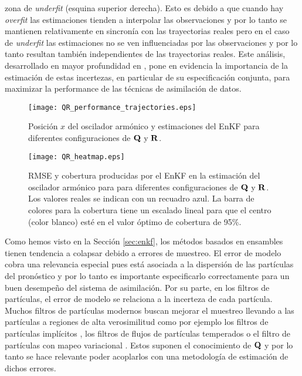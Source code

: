 zona de \textit{underfit} (esquina superior derecha). Esto es debido a que cuando hay \textit{overfit} las estimaciones tienden a interpolar las observaciones y por lo tanto se mantienen relativamente en sincronía con las trayectorias reales pero en el caso de \textit{underfit} las estimaciones no se ven influenciadas por las observaciones y por lo tanto resultan también independientes de las trayectorias reales. Este análisis, desarrollado en mayor profundidad en \cite{Tandeo2020}, pone en evidencia la importancia de la estimación de estas incertezas, en particular de su especificación conjunta, para maximizar la performance de las técnicas de asimilación de datos.

\begin{figure}[h]
    \centering
    \texttt{[image: QR\_performance\_trajectories.eps]}
    \caption{Posición $x$ del oscilador armónico y estimaciones del EnKF para diferentes configuraciones de $\mathbf{Q}$ y $\mathbf{R}$.}
    \label{fig:QR_performance_trajectories}
\end{figure}

\begin{figure}[h]
    \centering
    \texttt{[image: QR\_heatmap.eps]}
    \caption{RMSE y cobertura producidas por el EnKF en la estimación del oscilador armónico para para diferentes configuraciones de $\mathbf{Q}$ y $\mathbf{R}$. Los valores reales se indican con un recuadro azul. La barra de colores para la cobertura tiene un escalado lineal para que el centro (color blanco) esté en el valor óptimo de cobertura de 95\%.}
    \label{fig:QR_heatmap}
\end{figure}

Como hemos visto en la Sección \ref{sec:enkf}, los métodos basados en ensambles tienen tendencia a colapsar debido a errores de muestreo. El error de modelo cobra una relevancia especial pues está asociada a la dispersión de las partículas del pronóstico y por lo tanto es importante especificarlo correctamente para un buen desempeño del sistema de asimilación. Por su parte, en los filtros de partículas, el error de modelo se relaciona a la incerteza de cada partícula. Muchos filtros de partículas modernos buscan mejorar el muestreo llevando a las partículas a regiones de alta verosimilitud como por ejemplo los filtros de partículas implícitos \citep{Chorin2009, Atkins2013, Zhu2016}, los filtros de flujos de partículas temperados \citep{Daum2009} o el filtro de partículas con mapeo variacional \citep{Pulido2019}. Estos suponen el conocimiento de $\mathbf{Q}$ y por lo tanto se hace relevante poder acoplarlos con una metodología de estimación de dichos errores.

